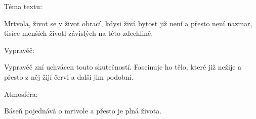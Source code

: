 \documentclass[11pt]{article}
\begin{document}
\setlength{\parindent}{0em}


Téma textu:

Mrtvola, život se v život obrací, kdysi živá bytost již není a přesto není nazmar, tisíce menších životl závislých na této zdechlině.

Vypravěč:

Vypravěč zní uchvácen touto skutečností. Fascinuje ho tělo, které již nežije a přesto z něj žijí červi a další jim podobní.

Atmosféra:

Báseň pojednává o mrtvole a přesto je plná života. 
\end{document}
